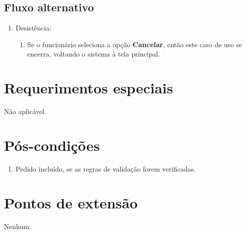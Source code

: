 \subsection{Fluxo alternativo}

\begin{enumerate}
	\item Desistência:
	\begin{enumerate}
		\item Se o funcionário seleciona a opção \textbf{Cancelar}, então este caso de uso se encerra, voltando o sistema à tela principal.
	\end{enumerate}	
\end{enumerate}

\section{Requerimentos especiais}

Não aplicável.

\section{Pós-condições}

\begin{enumerate}
	\item Pedido incluído, se as regras de validação forem verificadas.
\end{enumerate}

\section{Pontos de extensão}

Nenhum.